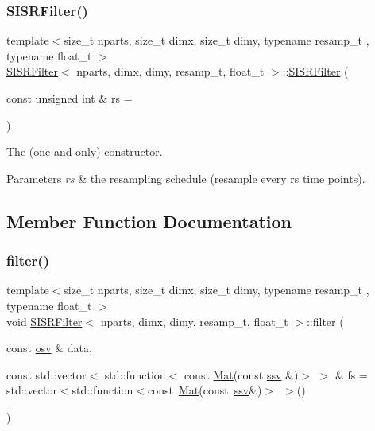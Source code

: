 \subsubsection{\texorpdfstring{S\+I\+S\+R\+Filter()}{SISRFilter()}}
{\footnotesize\ttfamily template$<$size\+\_\+t nparts, size\+\_\+t dimx, size\+\_\+t dimy, typename resamp\+\_\+t , typename float\+\_\+t $>$ \\
\hyperlink{classSISRFilter}{S\+I\+S\+R\+Filter}$<$ nparts, dimx, dimy, resamp\+\_\+t, float\+\_\+t $>$\+::\hyperlink{classSISRFilter}{S\+I\+S\+R\+Filter} (\begin{DoxyParamCaption}\item[{const unsigned int \&}]{rs = {} }\end{DoxyParamCaption})}



The (one and only) constructor. 


\begin{DoxyParams}{Parameters}
{\em rs} & the resampling schedule (resample every rs time points). \\
\hline
\end{DoxyParams}


\subsection{Member Function Documentation}
\mbox{\label{classSISRFilter_a0fd4ac5135ff9a4bb32a286533855197}} 
\subsubsection{\texorpdfstring{filter()}{filter()}}
{\footnotesize\ttfamily template$<$size\+\_\+t nparts, size\+\_\+t dimx, size\+\_\+t dimy, typename resamp\+\_\+t , typename float\+\_\+t $>$ \\
void \hyperlink{classSISRFilter}{S\+I\+S\+R\+Filter}$<$ nparts, dimx, dimy, resamp\+\_\+t, float\+\_\+t $>$\+::filter (\begin{DoxyParamCaption}\item[{const \hyperlink{classSISRFilter_a5b762e9352857a9e48db3932191887ef}{osv} \&}]{data,  }\item[{const std\+::vector$<$ std\+::function$<$ const \hyperlink{classSISRFilter_a7355e966778c788dfe227ef5254677c4}{Mat}(const \hyperlink{classSISRFilter_abfec45cf57ea6fadae4a9da8b0042351}{ssv} \&)$>$ $>$ \&}]{fs = {\ttfamily std\+:\+:vector$<$std\+:\+:function$<$const~\hyperlink{classSISRFilter_a7355e966778c788dfe227ef5254677c4}{Mat}(const~\hyperlink{classSISRFilter_abfec45cf57ea6fadae4a9da8b0042351}{ssv}\&)$>$~$>$()} }\end{DoxyParamCaption})}



